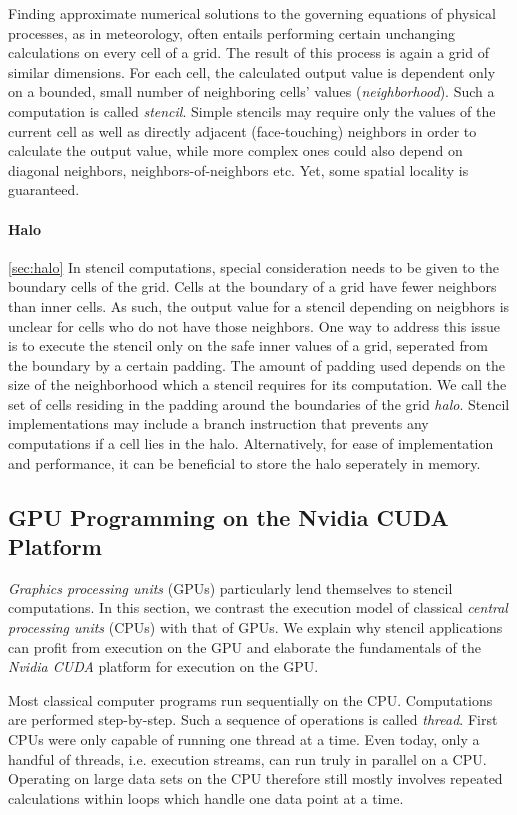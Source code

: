 Finding approximate numerical solutions to the governing equations of physical processes, as in meteorology, often entails performing certain unchanging calculations on every cell of a grid. The result of this process is again a grid of similar dimensions. For each cell, the calculated output value is dependent only on a bounded, small number of neighboring cells' values (\emph{neighborhood}). Such a computation is called \emph{stencil}. Simple stencils may require only the values of the current cell as well as directly adjacent (face-touching) neighbors in order to calculate the output value, while more complex ones could also depend on diagonal neighbors, neighbors-of-neighbors etc. Yet, some spatial locality is guaranteed. 

\paragraph{Halo} \ref{sec:halo} In stencil computations, special consideration needs to be given to the boundary cells of the grid. Cells at the boundary of a grid have fewer neighbors than inner cells. As such, the output value for a stencil depending on neigbhors is unclear for cells who do not have those neighbors. One way to address this issue is to execute the stencil only on the safe inner values of a grid, seperated from the boundary by a certain padding. The amount of padding used depends on the size of the neighborhood which a stencil requires for its computation. We call the set of cells residing in the padding around the boundaries of the grid \emph{halo}. Stencil implementations may include a branch instruction that prevents any computations if a cell lies in the halo. Alternatively, for ease of implementation and performance, it can be beneficial to store the halo seperately in memory.

\subsection{GPU Programming on the Nvidia CUDA Platform}

\emph{Graphics processing units} (GPUs) particularly lend themselves to stencil computations. In this section, we contrast the execution model of classical \emph{central processing units} (CPUs) with that of GPUs. We explain why stencil applications can profit from execution on the GPU and elaborate the fundamentals of the \emph{Nvidia CUDA} platform for execution on the GPU.

Most classical computer programs run sequentially on the CPU. Computations are performed step-by-step. Such a sequence of operations is called \emph{thread}. First CPUs were only capable of running one thread at a time. Even today, only a handful of threads, i.e. execution streams, can run truly in parallel on a CPU. Operating on large data sets on the CPU therefore still mostly involves repeated calculations within loops which handle one data point at a time.

